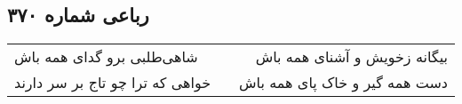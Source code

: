 \begin{center}
\section*{رباعی شماره ۳۷۰}
\label{sec:sh370}
\begin{longtable}{l p{0.5cm} r}
شاهی‌طلبی برو گدای همه باش
&&
بیگانه زخویش و آشنای همه باش
\\
خواهی که ترا چو تاج بر سر دارند
&&
دست همه گیر و خاک پای همه باش
\\
\end{longtable}
\end{center}
